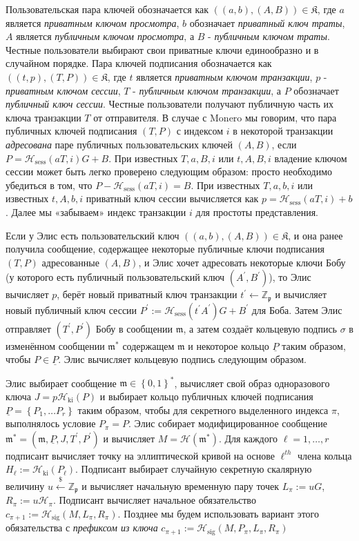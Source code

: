 \documentclass{mrl}
\theoremstyle{definition}
\numberwithin{theorem}{subsection}
\newcommand{\scalarField}{\mathbb{Z}_{\mathfrak{p}}}
\newcommand{\m}{\mathfrak{m}}
\begin{document}
Пользовательская пара ключей обозначается как $((a,b),(A,B)) \in \mathfrak{K}$, где $a$ является \textit{приватным ключом просмотра}, $b$ обозначает \textit{приватный ключ траты}, $A$ является \textit{публичным ключом просмотра}, а $B$ - \textit{публичным ключом траты}. Честные пользователи выбирают свои приватные ключи единообразно и в случайном порядке. Пара ключей подписания обозначается как $((t,p),(T,P)) \in \mathfrak{K}$, где $t$ является \textit{приватным ключом транзакции}, $p$ - \textit{приватным ключом сессии}, $T$ - \textit{публичным ключом транзакции}, а $P$ обозначает \textit{публичный ключ сессии}. Честные пользователи получают публичную часть их ключа транзакции $T$ от отправителя. В случае с Monero мы говорим, что пара публичных ключей подписания $(T,P)$ с индексом $i$ в некоторой транзакции \textit{адресована} паре публичных пользовательских ключей $(A,B)$, если $P = \mathcal{H}_{\text{sess}}(aT, i)G + B$. При известных $T, a, B, i$ или $t, A, B, i$ владение ключом сессии может быть легко проверено следующим образом: просто необходимо убедиться в том, что $P - \mathcal{H}_{\text{sess}}(aT, i) = B$. При известных $T, a, b, i$ или известных $t, A, b, i$ приватный ключ сессии вычисляется как $p = \mathcal{H}_{\text{sess}}(aT, i) + b$. Далее мы «забываем» индекс транзакции $i$ для простоты представления.

Если у Элис есть пользовательский ключ $((a,b),(A,B)) \in \mathfrak{K}$, и она ранее получила сообщение, содержащее некоторые публичные ключи подписания $(T, P)$ адресованные $(A,B)$, и Элис хочет адресовать некоторые ключи Бобу (у которого есть публичный пользовательский ключ $(A^{\prime}, B^{\prime})$), то Элис вычисляет $p$, берёт новый приватный ключ транзакции $t^{\prime} \leftarrow \scalarField$ и вычисляет новый публичный ключ сессии $P^{\prime} := \mathcal{H}_{\text{sess}}(t^{\prime} A^{\prime})G + B^\prime$ для Боба. Затем Элис отправляет $(T^{\prime}, P^{\prime})$ Бобу в сообщении $\m$, а затем создаёт кольцевую подпись $\sigma$ в изменённом сообщении $\m^*$ содержащем $\m$ и некоторое кольцо $\underline{P}$ таким образом, чтобы $P \in \underline{P}$. Элис вычисляет кольцевую подпись следующим образом.

Элис выбирает сообщение $\m \in \left\{0,1\right\}^*$, вычисляет свой образ одноразового ключа $J = p\mathcal{H}_{\text{ki}}(P)$ и выбирает кольцо публичных ключей подписания $\underline{P}=\left\{P_1, \ldots P_r\right\}$ таким образом, чтобы для секретного выделенного индекса $\pi$, выполнялось условие $P_{\pi}=P$. Элис собирает модифицированное сообщение $\m^* = (\m, \underline{P}, J, T^{\prime}, P^{\prime})$ и вычисляет $M = \mathcal{H}(\m^*)$. Для каждого $\ell=1,\ldots,r$ подписант вычисляет точку на эллиптической кривой на основе $\ell^{th}$ члена кольца $H_\ell := \mathcal{H}_{\text{ki}}(P_\ell)$. Подписант выбирает случайную секретную скалярную величину $u \overset{\$}{\leftarrow} \scalarField$ и вычисляет начальную временную пару точек $L_{\pi} := uG$, $R_{\pi} := u\mathcal{H}_{\pi}$. Подписант вычисляет начальное обязательство $c_{\pi+1} := \mathcal{H}_{\text{sig}}(M,L_{\pi}, R_{\pi})$. Позднее мы будем использовать вариант этого обязательства с \textit{префиксом из ключа} $c_{\pi+1} := \mathcal{H}_{\text{sig}}(M,P_\pi, L_{\pi}, R_{\pi})$
\end{document}
